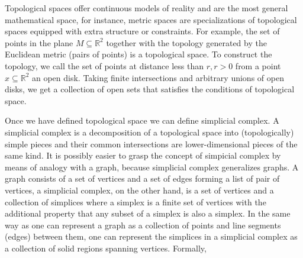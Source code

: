\documentclass[onecollarge,runningheads]{svjour2}
\begin{document}
Topological spaces offer continuous models of reality and are the most general mathematical space, for instance, metric spaces are specializations of topological spaces equipped with extra structure or constraints.
For example, the set of points in the plane $M \subseteq \mathbb{R}^2$ together with the topology generated by the Euclidean metric (pairs of points) is a topological space. To construct the topology, we call the set of points at distance less than $r, r > 0$ from a point $x \subseteq \mathbb{R}^2$ an open disk. Taking finite intersections and arbitrary unions of open disks, we get a collection of open sets that satisfies the conditions of topological space.


Once we have defined topological space we can define simplicial complex. A simplicial complex is a decomposition of a topological space into (topologically) simple pieces and their common intersections are lower-dimensional pieces of the same kind. It is possibly easier to grasp the concept of simpicial complex by means of analogy with a graph, because  simplicial complex generalizes graphs.
A graph consists of a set of vertices and a set of edges forming a list of pair of vertices, a simplicial complex, on the other hand, is a set of vertices and a collection of simplices where a simplex is a finite set of vertices with the additional property that any subset of a simplex is also a simplex. In the same way as one can represent a graph as a collection of points and line segments (edges) between them, one can represent the simplices in a simplicial complex as a collection of solid regions spanning vertices. Formally,
\end{document}
